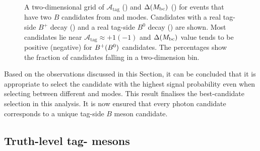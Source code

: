 \begin{figure}[hbtp!]
    \centering
    \caption{\label{fig:selecting_tag_mode} A two-dimensional grid of $\mathcal{A}_{\mathrm{tag}}$ ()
    and $\Delta({M_{\mathrm{bc}}})$ () for events that have two $B$ candidates from \feiBp and \feiBz modes.
    Candidates with a real tag-side $B^+$ decay ()
    and a real tag-side $B^0$ decay () are shown.
    Most candidates lie near $\mathcal{A}_{\mathrm{tag}}\approx +1 (-1)$ and
    $\Delta({M_{\mathrm{bc}}})$ value tends to be positive (negative) for $B^+(B^0)$ candidates.
    The percentages show the fraction of candidates falling in a two-dimension bin.
    }
\end{figure}

Based on the observations discussed in this Section, it can be concluded that it is appropriate to select the \FEI candidate with the highest signal probability even when selecting between different \feiBp and \feiBz modes.
This result finalises the best-candidate selection in this analysis.
It is now ensured that every photon candidate corresponds to a unique tag-side $B$ meson candidate.

\subsection{Truth-level tag-\texorpdfstring{\B}{B} mesons}\label{sec:good_tag_definition}

